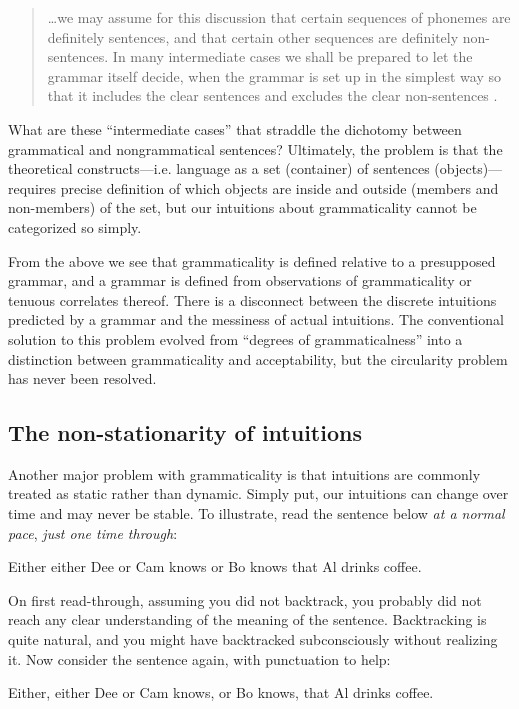 \begin{quote}	
…we may assume for this discussion that certain sequences of phonemes are definitely sentences, and that certain other sequences are definitely non-sentences. In many intermediate cases we shall be prepared to let the grammar itself decide, when the grammar is set up in the simplest way so that it includes the clear sentences and excludes the clear non-sentences \citep[14]{Chomsky1957}.
\end{quote}

  What are these “intermediate cases” that straddle the dichotomy between grammatical and nongrammatical sentences? Ultimately, the problem is that the theoretical constructs—i.e. language as a set (container) of sentences (objects)—requires precise definition of which objects are inside and outside (members and non-members) of the set, but our intuitions about grammaticality cannot be categorized so simply.

  From the above we see that grammaticality is defined relative to a presupposed grammar, and a grammar is defined from observations of grammaticality or tenuous correlates thereof. There is a disconnect between the discrete intuitions predicted by a grammar and the messiness of actual intuitions. The conventional solution to this problem evolved from “degrees of grammaticalness” into a distinction between grammaticality and acceptability, but the circularity problem has never been resolved. 

\subsection{The non-stationarity of intuitions}

Another major problem with grammaticality is that intuitions are commonly treated as static rather than dynamic. Simply put, our intuitions can change over time and may never be stable. To illustrate, read the sentence below \textit{at a normal pace}, \textit{just one time through}:

\ea
    {Either either Dee or Cam knows or Bo knows that Al drinks coffee.}
\z    

On first read-through, assuming you did not backtrack, you probably did not reach any clear understanding of the meaning of the sentence. Backtracking is quite natural, and you might have backtracked subconsciously without realizing it. Now consider the sentence again, with punctuation to help:

\ea
Either, either Dee or Cam knows, or Bo knows, that Al drinks coffee.
\z

